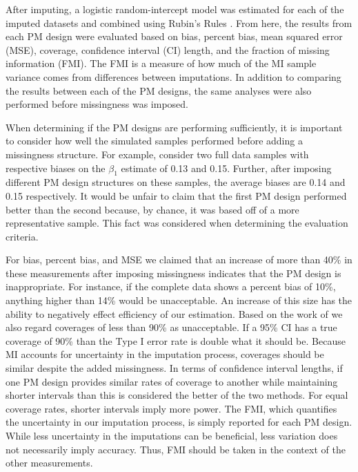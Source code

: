 \documentclass{svjour3}\usepackage[]{graphicx}\usepackage[]{color}
\begin{document}
After imputing, a logistic random-intercept model was estimated for each of the imputed datasets and combined using Rubin's Rules \citep{rubin2004multiple}. From here, the results from each PM design were evaluated based on bias, percent bias, mean squared error (MSE), coverage, confidence interval (CI) length, and the fraction of missing information (FMI). The FMI is a measure of how much of the MI sample variance comes from differences between imputations. In addition to comparing the results between each of the PM designs, the same analyses were also performed before missingness was imposed. \par

When determining if the PM designs are performing sufficiently, it is important to consider how well the simulated samples performed before adding a missingness structure. For example, consider two full data samples with respective biases on the $\beta_1$ estimate of 0.13 and 0.15. Further, after imposing different PM design structures on these samples, the average biases are 0.14 and 0.15 respectively. It would be unfair to claim that the first PM design performed better than the second because, by chance, it was based off of a more representative sample. This fact was considered when determining the evaluation criteria. \par

For bias, percent bias, and MSE we claimed that an increase of more than 40\% in these measurements after imposing missingness indicates that the PM design is inappropriate. For instance, if the complete data shows a percent bias of 10\%, anything higher than 14\% would be unacceptable. An increase of this size has the ability to negatively effect efficiency of our estimation. Based on the work of \citet{collins2001comparison} we also regard coverages of less than 90\% as unacceptable. If a 95\% CI has a true coverage of 90\% than the Type I error rate is double what it should be. Because MI accounts for uncertainty in the imputation process, coverages should be similar despite the added missingness. In terms of confidence interval lengths, if one PM design provides similar rates of coverage to another while maintaining shorter intervals than this is considered the better of the two methods. For equal coverage rates, shorter intervals imply more power. The FMI, which quantifies the uncertainty in our imputation process, is simply reported for each PM design. While less uncertainty in the imputations can be beneficial, less variation does not necessarily imply accuracy. Thus, FMI should be taken in the context of the other measurements. \par
\end{document}
